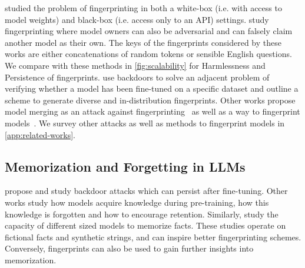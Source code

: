 \citet{xu2024instructionalfingerprintinglargelanguage} studied the problem of fingerprinting in both a white-box (i.e. with access to model weights) and black-box (i.e. access only to an API) settings. 
\citet{russinovich2024heythatsmodelintroducing} study fingerprinting where model owners can also be adversarial and can falsely claim another model as their own. 
The keys of the fingerprints considered by these works are either concatenations of random tokens or sensible English questions. We compare with these methods in \cref{fig:scalability} for Harmlessness and Persistence of fingerprints. \citet{zhang2024vtuneverifiablefinetuningllms} use backdoors to solve an adjacent problem of verifying whether a model has been fine-tuned on a specific dataset and outline a scheme to generate diverse and in-distribution fingerprints. Other works propose model merging as an attack against fingerprinting~\cite{yamabe2024mergeprintrobustfingerprintingmerging, cong2023have} as well as a way to fingerprint models~\cite{xu2024fp}. We survey other attacks as well as methods to fingerprint models in \cref{app:related-works}.








\subsection{Memorization and Forgetting in LLMs }
\citet{zhang2024persistentpretrainingpoisoningllms} propose and study backdoor attacks which can persist after fine-tuning.   Other works \cite{chang2024largelanguagemodelsacquire, chen2024continualmemorizationfactoidslarge, jagielski2023measuringforgettingmemorizedtraining} study how models acquire knowledge during pre-training, how this knowledge is forgotten and how to encourage retention. Similarly, \citet{allenzhu2024physicslanguagemodels33} study 
the capacity of different sized models to memorize facts. These studies operate on fictional facts and synthetic strings, and can inspire better fingerprinting schemes. Conversely, fingerprints can also be used to gain further insights into memorization.